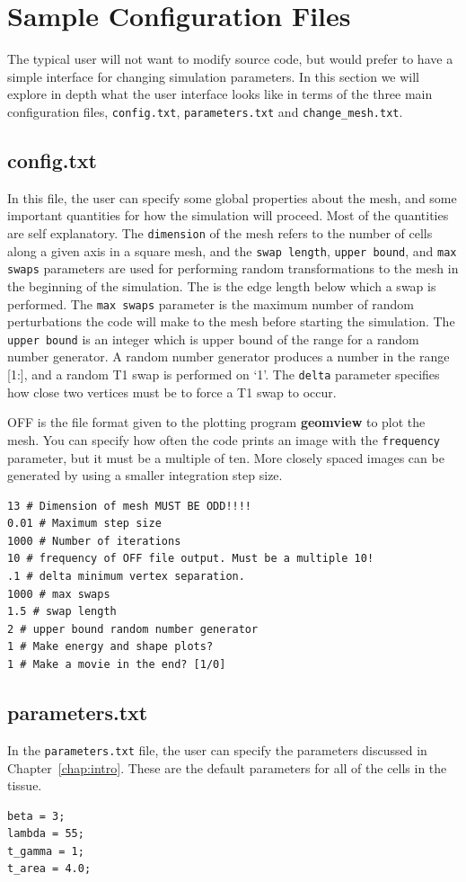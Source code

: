 \section{Sample Configuration Files}
The typical user will not want to modify source code, but would prefer to have a simple interface for changing simulation parameters. In this section we will explore in depth what the user interface looks like in terms of the three main configuration files, \texttt{config.txt}, \texttt{parameters.txt} and \texttt{change\_mesh.txt}.
\subsection{config.txt}
In this file, the user can specify some global properties about the mesh, and some important quantities for how the simulation will proceed. Most of the quantities are self explanatory. The \texttt{dimension} of the mesh refers to the number of cells along a given axis in a square mesh, and the \texttt{swap length}, \texttt{upper bound}, and \texttt{max swaps} parameters are used for performing random transformations to the mesh in the beginning of the simulation. The  is the edge length below which a swap is performed. The \texttt{max swaps} parameter is the maximum number of random perturbations the code will make to the mesh before starting the simulation. The \texttt{upper bound} is an integer which is upper bound of the range for a random number generator. A random number generator produces a number in the range [1:], and a random T1 swap is performed on `1'. The \texttt{delta} parameter specifies how close two vertices must be to force a T1 swap to occur.

OFF is the file format given to the plotting program \textbf{geomview} to plot the mesh. You can specify how often the code prints an image with the \texttt{frequency} parameter, but it must be a multiple of ten. More closely spaced images can be generated by using a smaller integration step size.
\begin{lstlisting}
13 # Dimension of mesh MUST BE ODD!!!!
0.01 # Maximum step size
1000 # Number of iterations
10 # frequency of OFF file output. Must be a multiple 10!
.1 # delta minimum vertex separation.
1000 # max swaps
1.5 # swap length
2 # upper bound random number generator
1 # Make energy and shape plots?
1 # Make a movie in the end? [1/0]
\end{lstlisting}

\subsection{parameters.txt}
In the \texttt{parameters.txt} file, the user can specify the parameters discussed in Chapter~\ref{chap:intro}. These are the default parameters for all of the cells in the tissue.
\begin{lstlisting}
beta = 3;
lambda = 55;
t_gamma = 1;
t_area = 4.0;
\end{lstlisting}

